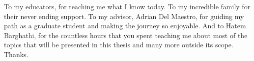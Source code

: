 \begin{singlespace}
To my educators, for teaching me what I know today. To my incredible family for their never ending support. To my advisor, Adrian Del Maestro, for guiding my path as a graduate student and making the journey so enjoyable. And to Hatem Barghathi, for the countless hours that you spent teaching me about most of the topics that will be presented in this thesis and many more outside its scope.
\\
Thanks.
\end{singlespace}